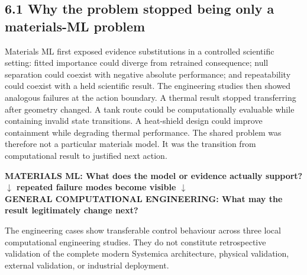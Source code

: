 \documentclass[10pt,a4paper]{article}
\begin{document}
\subsection{6.1 Why the problem stopped being only a materials-ML problem}
Materials ML first exposed evidence substitutions in a controlled scientific setting: fitted importance could diverge from retrained consequence; null separation could coexist with negative absolute performance; and repeatability could coexist with a held scientific result. The engineering studies then showed analogous failures at the action boundary. A thermal result stopped transferring after geometry changed. A tank route could be computationally evaluable while containing invalid state transitions. A heat-shield design could improve containment while degrading thermal performance. The shared problem was therefore not a particular materials model. It was the transition from computational result to justified next action.

\begin{center}\small\bfseries
MATERIALS ML: What does the model or evidence actually support?\\[2pt]
$\downarrow$ repeated failure modes become visible $\downarrow$\\[2pt]
GENERAL COMPUTATIONAL ENGINEERING: What may the result legitimately change next?
\end{center}

The engineering cases show transferable control behaviour across three local computational engineering studies. They do not constitute retrospective validation of the complete modern Systemica architecture, physical validation, external validation, or industrial deployment.
\end{document}
